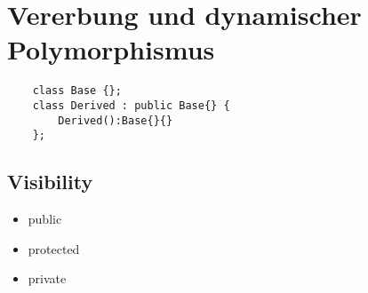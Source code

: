 \section{Vererbung und dynamischer Polymorphismus}
\begin{lstlisting}
	class Base {};
	class Derived : public Base{} {
		Derived():Base{}{}
	};
\end{lstlisting}

\subsection{Visibility}
\begin{itemize}
	\item public
	\item protected
	\item private
\end{itemize}

